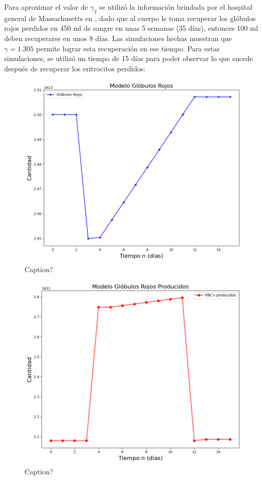 Para aproximar el valor de $\gamma_2$ se utilizó la información brindada por el hospital general de Massachusetts en \cite{Massachusetts}, dado que al cuerpo le toma recuperar los glóbulos rojos perdidos en 450 ml de sangre en unas 5 semanas (35 días), entonces 100 ml deben recuperarse en unos 8 días. Las simulaciones hechas muestran que $\gamma=1.305$ permite lograr esta recuperación en ese tiempo.
Para estas simulaciones, se utilizó un tiempo de 15 días para poder observar lo que sucede después de recuperar los eritrocitos perdidos:

\begin{figure}[H]
    \centering
    \includegraphics[scale=0.57]{figures/HemoLeveG13RBC.png}
    \caption{Caption?}
    \label{sec:variaciones:fig:HemoLeveG13RBC}
\end{figure}

\begin{figure}[H]
    \centering
    \includegraphics[scale=0.57]{figures/HemoLeveG13SC.png}
    \caption{Caption?}
    \label{sec:variaciones:fig:HemoLeveG13SC}
\end{figure}

